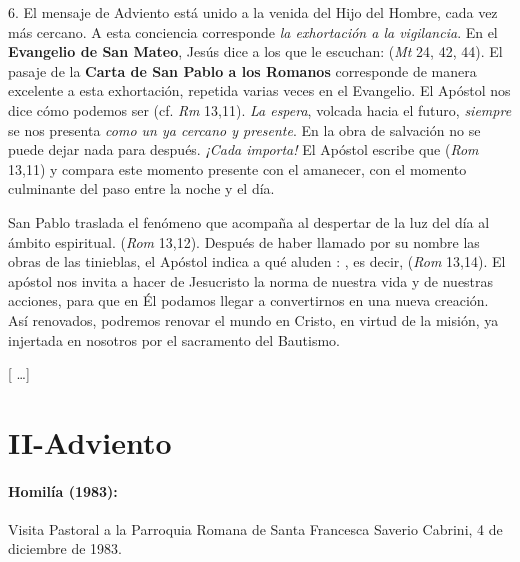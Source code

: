 \begin{body}
\begin{body}
		6. El mensaje de Adviento está unido a la venida del Hijo del Hombre, cada vez más cercano. A esta conciencia corresponde \emph{la exhortación a la vigilancia}. En el \textbf{Evangelio de San Mateo}, Jesús dice a los que le escuchan:  (\emph{Mt} 24, 42, 44). El pasaje de la \textbf{Carta de San Pablo a los Romanos} corresponde de manera excelente a esta exhortación, repetida varias veces en el Evangelio. El Apóstol nos dice cómo podemos ser  (cf. \emph{Rm} 13,11). \emph{La espera}, volcada hacia el futuro, \emph{siempre} se nos presenta \emph{como un  ya cercano y presente}. En la obra de salvación no se puede dejar nada para después. \emph{¡Cada  importa!} El Apóstol escribe que  (\emph{Rom} 13,11) y compara este momento presente con el amanecer, con el momento culminante del paso entre la noche y el día.

		San Pablo traslada el fenómeno que acompaña al despertar de la luz del día al ámbito espiritual.  (\emph{Rom} 13,12). Después de haber llamado por su nombre las obras de las tinieblas, el Apóstol indica a qué aluden : , es decir,  (\emph{Rom} 13,14). El apóstol nos invita a hacer de Jesucristo la norma de nuestra vida y de nuestras acciones, para que en Él podamos llegar a convertirnos en una nueva creación. Así renovados, podremos renovar el mundo en Cristo, en virtud de la misión, ya injertada en nosotros por el sacramento del Bautismo.

		{[} \ldots{}{]}
	\end{body}

	\chapter{II-Adviento}

	\subsubsection{Homilía (1983):} Visita Pastoral a la Parroquia Romana de Santa Francesca Saverio Cabrini, 4 de diciembre de 1983.


\end{body}
